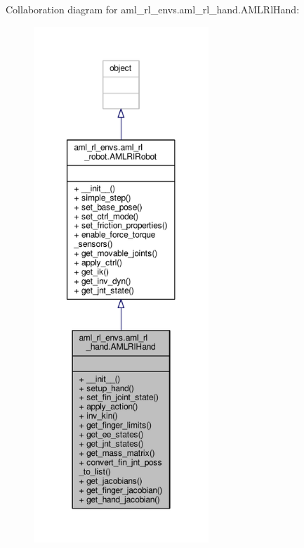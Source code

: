 Collaboration diagram for aml\-\_\-rl\-\_\-envs.\-aml\-\_\-rl\-\_\-hand.\-A\-M\-L\-Rl\-Hand\-:
\nopagebreak
\begin{figure}[H]
\begin{center}
\leavevmode
\includegraphics[height=550pt]{classaml__rl__envs_1_1aml__rl__hand_1_1_a_m_l_rl_hand__coll__graph}
\end{center}
\end{figure}
